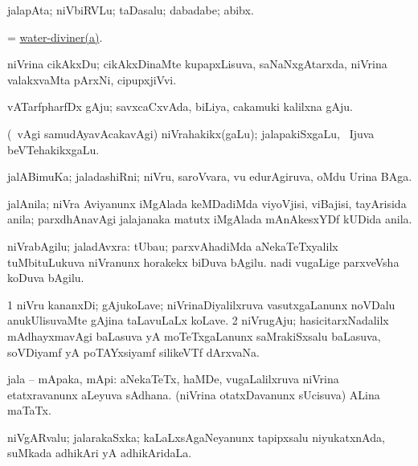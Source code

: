 \bentry
{} 
\gl{\nA}
\expl{}
\bmng
jalapAta; niVbiRVLu; taDasalu; dabadabe; abibx. 
\emng
\eentry

\bentry
{} 
\gl{\nA}
\expl{}
\bmng
= \hyperlink{water-diviner}{water-diviner(a)}. 
\emng
\eentry

\bentry
{} 
\gl{\nA}
\expl{}
\bmng
niVrina cikAkxDu; cikAkxDinaMte kupapxLisuva, saNaNxgAtarxda, niVrina valakxvaMta pArxNi, cipupxjiVvi. 
\emng
\eentry

\bentry
{} 
\gl{\nA}
\expl{}
\bmng
vATarfpharfDx gAju; savxcaCxvAda, biLiya, cakamuki kalilxna gAju. 
\emng
\eentry

\bentry
{} 
\gl{\nA}
\expl{}
\bmng
(\sA\ \bava vAgi samudAyavAcakavAgi) niVrahakikx(gaLu); jalapakiSxgaLu, \kanmu\ Ijuva beVTehakikxgaLu. 
\emng
\eentry

\bentry
{} 
\gl{\nA}
\expl{}
\bmng
jalABimuKa; jaladashiRni; niVru, saroVvara, \mo vu edurAgiruva, oMdu Urina BAga. 
\emng
\eentry

\bentry
{} 
\gl{\nA}
\expl{}
\bmng
jalAnila; niVra Aviyanunx iMgAlada keMDadiMda viyoVjisi, viBajisi, tayArisida anila; parxdhAnavAgi jalajanaka matutx iMgAlada mAnAkesxYDf kUDida anila. 
\emng
\eentry

\bentry
{} 
\gl{\nA}
\expl{}
\bmng
niVrabAgilu; jaladAvxra: 
\banum
{} tUbau; parxvAhadiMda aNekaTeTxyalilx tuMbituLukuva niVranunx horakekx biDuva bAgilu. 
 nadi \mo vugaLige parxveVsha koDuva bAgilu. 
\eanum
\emng
\eentry

\bentry
{} 
\gl{\nA}
\expl{}
\bmng
\bnum
\num{1} niVru kananxDi; gAjukoLave; niVrinaDiyalilxruva vasutxgaLanunx noVDalu anukUlisuvaMte gAjina taLavuLaLx koLave. 
\num{2} niVrugAju; hasicitarxNadalilx mAdhayxmavAgi baLasuva yA moTeTxgaLanunx saMrakiSxsalu baLasuva, soVDiyamf yA poTAYxsiyamf silikeVTf dArxvaNa. 
\enum
\emng
\eentry

\bentry
{} 
\gl{\nA}
\expl{}
\bmng
jala -- mApaka, mApi: 
\banum
{} aNekaTeTx, haMDe, \mo vugaLalilxruva niVrina etatxravanunx aLeyuva sAdhana. 
 (niVrina otatxDavanunx sUcisuva) ALina maTaTx. 
\eanum
\emng
\eentry

\bentry
{} 
\gl{\nA}
\expl{}
\bmng
niVgARvalu; jalarakaSxka; kaLaLxsAgaNeyanunx tapipxsalu niyukatxnAda, suMkada adhikAri yA adhikAridaLa. 
\emng
\eentry

